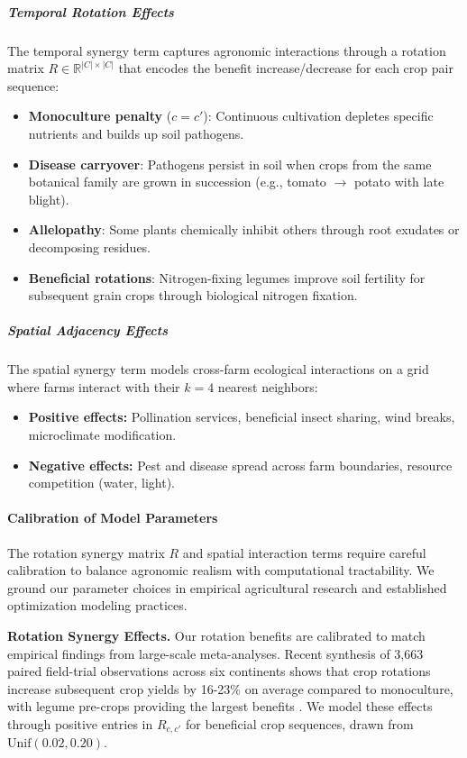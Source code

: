 \documentclass{oqireport}
\begin{document}
\subparagraph{Temporal Rotation Effects}
The temporal synergy term captures agronomic interactions through a rotation matrix $R \in \mathbb{R}^{|C| \times |C|}$ that encodes the benefit increase/decrease for each crop pair sequence:
\begin{itemize}
    \item \textbf{Monoculture penalty} ($c = c'$): Continuous cultivation depletes specific nutrients and builds up soil pathogens.
    \item \textbf{Disease carryover}: Pathogens persist in soil when crops from the same botanical family are grown in succession (e.g., tomato $\to$ potato with late blight).
    \item \textbf{Allelopathy}: Some plants chemically inhibit others through root exudates or decomposing residues.
    \item \textbf{Beneficial rotations}: Nitrogen-fixing legumes improve soil fertility for subsequent grain crops through biological nitrogen fixation.
\end{itemize}

\subparagraph{Spatial Adjacency Effects}
The spatial synergy term models cross-farm ecological interactions on a grid where farms interact with their $k=4$ nearest neighbors:
\begin{itemize}
    \item \textbf{Positive effects:} Pollination services, beneficial insect sharing, wind breaks, microclimate modification.
    \item \textbf{Negative effects:} Pest and disease spread across farm boundaries, resource competition (water, light).
\end{itemize}





\paragraph{Calibration of Model Parameters}

The rotation synergy matrix $R$ and spatial interaction terms require careful calibration to balance agronomic realism with computational tractability. We ground our parameter choices in empirical agricultural research and established optimization modeling practices.

\textbf{Rotation Synergy Effects.}
Our rotation benefits are calibrated to match empirical findings from large-scale meta-analyses. Recent synthesis of 3,663 paired field-trial observations across six continents shows that crop rotations increase subsequent crop yields by 16-23\% on average compared to monoculture, with legume pre-crops providing the largest benefits \cite{mudare2025crop}. We model these effects through positive entries in $R_{c,c'}$ for beneficial crop sequences, drawn from $\text{Unif}(0.02, 0.20)$.
\end{document}
